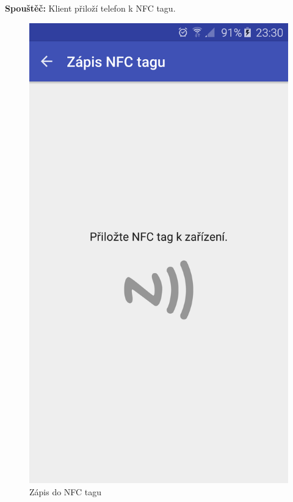 \documentclass[czech,master,public,dept460,male,java,cpdeclaration]{diploma}
\begin{document}
\vspace{0.1cm}
\noindent
\textbf{Spouštěč:} Klient přiloží telefon k NFC tagu.

\begin{figure}[H]
\begin{minipage}{.5\textwidth}
\centering
                \includegraphics[scale=0.14]{img/screen/zapisnfcdetail.png}
        \caption{Zápis do NFC tagu}
        \label{fig:nfczapis}
\end{minipage}
\begin{minipage}{.5\textwidth}

\end{minipage}
\end{figure}
\end{document}
